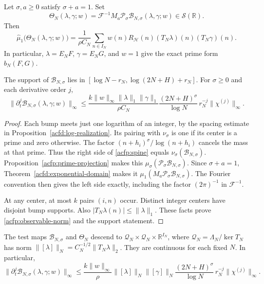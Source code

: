 \begin{theorem}\label{acfp:exact-observable}
Let $\sigma,a\geq0$ satisfy $\sigma+a=1$.
Set
\[
 \Theta_N(\lambda,\gamma;w)
   =\mathcal F^{-1}M_a\mathcal P_\sigma
                      \mathcal B_{N,\sigma}(\lambda,\gamma;w)
       \in\mathcal S(\mathbb R).
\]
Then
\begin{equation}\label{acfp:spine}
 \widehat\mu_1\bigl(\Theta_N(\lambda,\gamma;w)\bigr)
   =\frac1{\rho C_N}\sum_{n\in I_N}
       w(n)R_{\mathcal H}(n)(T_N\lambda)(n)(T_N\gamma)(n).
\end{equation}
In particular, $\lambda=E_NF$, $\gamma=E_NG$, and $w=1$ give
the exact prime form $b_N(F,G)$.

The support of $\mathcal B_{N,\sigma}$ lies in
$[\log N-r_N,\log(2N+H)+r_N]$.
For $\sigma\geq0$ and each derivative order $j$,
\begin{equation}\label{acfp:observable-norm}
 \|\partial_t^j\mathcal B_{N,\sigma}(\lambda,\gamma;w)\|_\infty
 \leq
 \frac{k\|w\|_\infty\|\lambda\|_1\|\gamma\|_1}
      {\rho C_N}
 \frac{(2N+H)^\sigma}{\log N}\,r_N^{-j}\|\chi^{(j)}\|_\infty.
\end{equation}
\end{theorem}

\begin{proof}
Each bump meets just one logarithm of an integer, by the spacing estimate
in Proposition~\ref{acfd:log-realization}.
Its pairing with $\nu_\sigma$ is one if its center is a prime and zero otherwise.
The factor $(n+h_i)^\sigma/\log(n+h_i)$ cancels the mass at that prime.
Thus the right side of \eqref{acfp:spine} equals
$\nu_\sigma(\mathcal B_{N,\sigma})$.
Proposition~\ref{acfp:prime-projection} makes this
$\mu_\sigma(\mathcal P_\sigma\mathcal B_{N,\sigma})$.
Since $\sigma+a=1$, Theorem~\ref{acfd:exponential-domain} makes it
$\mu_1(M_a\mathcal P_\sigma\mathcal B_{N,\sigma})$.
The Fourier convention then gives the left side exactly, including the
factor $(2\pi)^{-1}$ in $\mathcal F^{-1}$.

At any center, at most $k$ pairs $(i,n)$ occur.
Distinct integer centers have disjoint bump supports.
Also $|T_N\lambda(n)|\leq\|\lambda\|_1$.
These facts prove \eqref{acfp:observable-norm} and the support statement.
\end{proof}

\begin{corollary}\label{acfp:quotient}
The test maps $\mathcal B_{N,\sigma}$ and $\Theta_N$ descend to
$\mathcal Q_N\times\mathcal Q_N\times\mathbb R^{I_N}$, where
$\mathcal Q_N=\Lambda_N/\ker T_N$ has norm
$\|[\lambda]\|_N=C_N^{-1/2}\|T_N\lambda\|_2$.
They are continuous for each fixed $N$.
In particular,
\[
 \|\partial_t^j\mathcal B_{N,\sigma}(\lambda,\gamma;w)\|_\infty
 \leq\frac{k\|w\|_\infty}{\rho}
 \|[\lambda]\|_N\|[\gamma]\|_N
 \frac{(2N+H)^\sigma}{\log N}\,r_N^{-j}\|\chi^{(j)}\|_\infty.
\]
\end{corollary}

